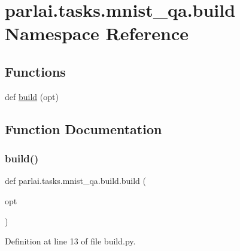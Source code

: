 \hypertarget{namespaceparlai_1_1tasks_1_1mnist__qa_1_1build}{}\section{parlai.\+tasks.\+mnist\+\_\+qa.\+build Namespace Reference}
\label{namespaceparlai_1_1tasks_1_1mnist__qa_1_1build}
\subsection*{Functions}
\begin{DoxyCompactItemize}
\item 
def \hyperlink{namespaceparlai_1_1tasks_1_1mnist__qa_1_1build_a76b349ca8131ab96d2e9991090ec92bb}{build} (opt)
\end{DoxyCompactItemize}


\subsection{Function Documentation}
\mbox{\label{namespaceparlai_1_1tasks_1_1mnist__qa_1_1build_a76b349ca8131ab96d2e9991090ec92bb}} 
\subsubsection{\texorpdfstring{build()}{build()}}
{\footnotesize\ttfamily def parlai.\+tasks.\+mnist\+\_\+qa.\+build.\+build (\begin{DoxyParamCaption}\item[{}]{opt }\end{DoxyParamCaption})}



Definition at line 13 of file build.\+py.

